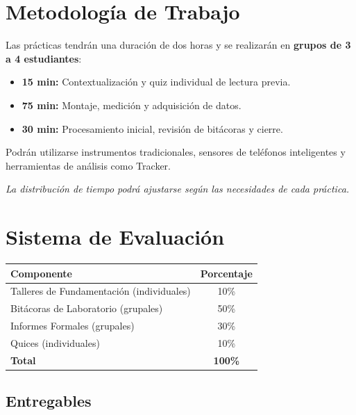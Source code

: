 \documentclass[11pt, letterpaper]{article}
\begin{document}
\section{Metodología de Trabajo}

Las prácticas tendrán una duración de dos horas y se realizarán en
\textbf{grupos de 3 a 4 estudiantes}:

\begin{itemize}
    \item \textbf{15 min:} Contextualización y quiz individual de lectura previa.
    \item \textbf{75 min:} Montaje, medición y adquisición de datos.
    \item \textbf{30 min:} Procesamiento inicial, revisión de bitácoras y cierre.
\end{itemize}

Podrán utilizarse instrumentos tradicionales, sensores de teléfonos
inteligentes y herramientas de análisis como Tracker.

\textit{La distribución de tiempo podrá ajustarse según las necesidades
de cada práctica.}

\section{Sistema de Evaluación}

\begin{center}
\begin{tabular}{@{}lc@{}}
\toprule
\textbf{Componente} & \textbf{Porcentaje} \\
\midrule
Talleres de Fundamentación (individuales) & 10\% \\
Bitácoras de Laboratorio (grupales) & 50\% \\
Informes Formales (grupales) & 30\% \\
Quices (individuales) & 10\% \\
\midrule
\textbf{Total} & \textbf{100\%} \\
\bottomrule
\end{tabular}
\end{center}

\subsection{Entregables}
\end{document}
